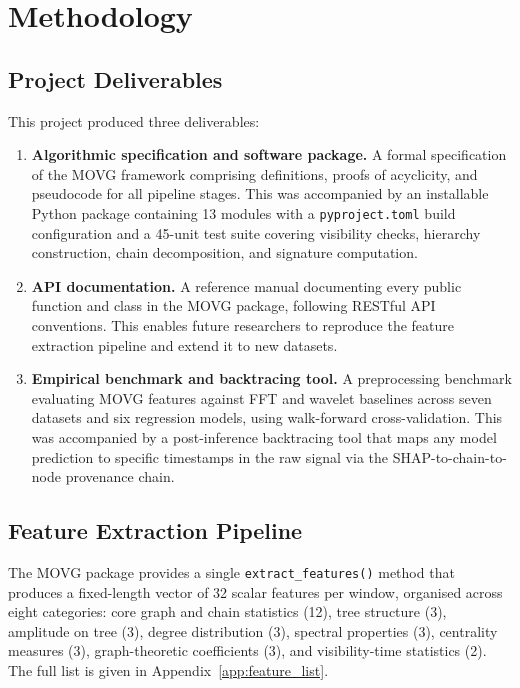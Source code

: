 \documentclass[a4paper,12pt]{article}
\begin{document}
\section{Methodology}
\label{sec:methodology}

\subsection{Project Deliverables}
\label{sec:deliverables}

This project produced three deliverables:

\begin{enumerate}[leftmargin=2em, itemsep=0.4em]
    \item \textbf{Algorithmic specification and software package.} A formal specification of the MOVG framework comprising definitions, proofs of acyclicity, and pseudocode for all pipeline stages. This was accompanied by an installable Python package containing 13 modules with a \texttt{pyproject.toml} build configuration and a 45-unit test suite covering visibility checks, hierarchy construction, chain decomposition, and signature computation.

    \item \textbf{API documentation.} A reference manual documenting every public function and class in the MOVG package, following RESTful API conventions. This enables future researchers to reproduce the feature extraction pipeline and extend it to new datasets.

    \item \textbf{Empirical benchmark and backtracing tool.} A preprocessing benchmark evaluating MOVG features against FFT and wavelet baselines across seven datasets and six regression models, using walk-forward cross-validation. This was accompanied by a post-inference backtracing tool that maps any model prediction to specific timestamps in the raw signal via the SHAP-to-chain-to-node provenance chain.
\end{enumerate}

\subsection{Feature Extraction Pipeline}
\label{sec:feature-pipeline}

The MOVG package provides a single \texttt{extract\_features()} method that produces a fixed-length vector of 32 scalar features per window, organised across eight categories: core graph and chain statistics (12), tree structure (3), amplitude on tree (3), degree distribution (3), spectral properties (3), centrality measures (3), graph-theoretic coefficients (3), and visibility-time statistics (2). The full list is given in Appendix~\ref{app:feature_list}.
\end{document}
